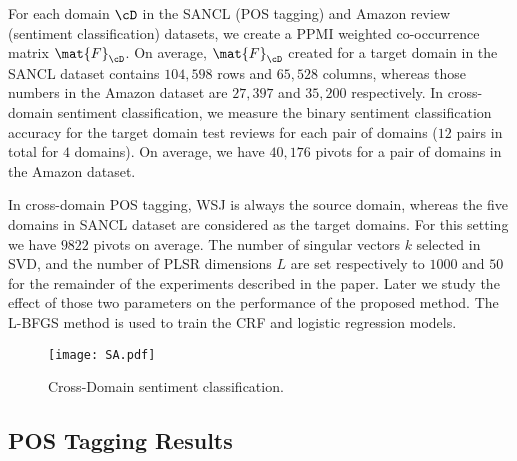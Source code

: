\documentclass[11pt]{article}
\begin{document}
For each domain $\cD$ in the SANCL (POS tagging) and Amazon review (sentiment classification) datasets, 
we create a PPMI weighted co-occurrence matrix $\mat{F}_{\cD}$.
On average, $\mat{F}_{\cD}$ created for a target domain in the SANCL dataset contains  $104,598$ rows and $65,528$ columns,
whereas those numbers in the Amazon dataset are $27,397$ and $35,200$ respectively.
In cross-domain sentiment classification, we measure the binary sentiment classification accuracy for the target domain 
test reviews for each pair of domains ($12$ pairs in total for $4$ domains).
On average, we have $40,176$ pivots for a pair of domains in the Amazon dataset.

In cross-domain POS tagging, WSJ is always the source domain, whereas the five domains in SANCL dataset
are considered as the target domains. For this setting we have $9822$ pivots on average.
The number of singular vectors $k$ selected in SVD, and the number of PLSR dimensions $L$
are set respectively to $1000$ and $50$ for the remainder of the experiments described in the paper.
Later we study the effect of those two parameters on the performance of the proposed method.
The L-BFGS \cite{Liu:1989} method is used to train the CRF and logistic regression models. 


\begin{figure*}[t]
\centering
\texttt{[image: SA.pdf]}
\caption{Cross-Domain sentiment classification.}
\label{fig:SA}
\end{figure*}

\subsection{POS Tagging Results}
\label{sec:POS:res}
\end{document}
